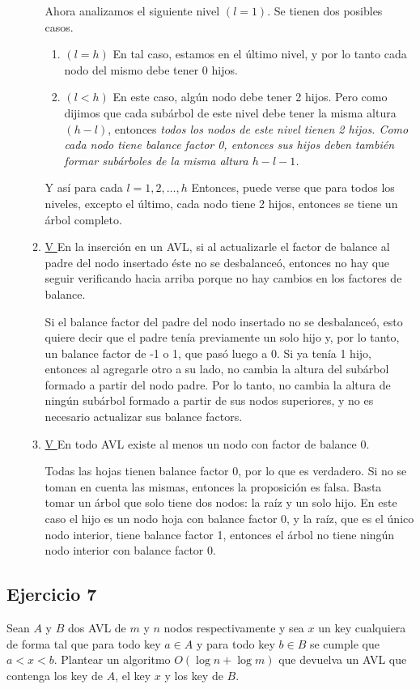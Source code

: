 \documentclass{article}
\begin{document}
\begin{enumerate}
\begin{enumerate}
Ahora analizamos el siguiente nivel $(l=1)$. Se tienen dos posibles casos.
\begin{enumerate}
    \item $(l=h)$ En tal caso, estamos en el último nivel, y por lo tanto cada nodo del mismo debe tener 0 hijos.
    \item $(l<h)$ En este caso, algún nodo debe tener 2 hijos. Pero como dijimos que cada subárbol de este nivel debe tener la misma altura $(h-l)$, entonces \em{todos} los nodos de este nivel tienen 2 hijos. Como cada nodo tiene balance factor 0, entonces sus hijos deben también formar subárboles de la misma altura $h-l-1$.
\end{enumerate}

Y así para cada $l = 1, 2, \dots, h$ Entonces, puede verse que para todos los niveles, excepto el último, cada nodo tiene 2 hijos, entonces se tiene un árbol completo.

\item \underline{ V } En la inserción en un AVL, si al actualizarle el factor de balance al padre del nodo insertado éste no se desbalanceó, entonces no hay que seguir verificando hacia arriba porque no hay cambios en los factores de balance.

Si el balance factor del padre del nodo insertado no se desbalanceó, esto quiere decir que el padre tenía previamente un solo hijo y, por lo tanto, un balance factor de -1 o 1, que pasó luego a 0. Si ya tenía 1 hijo, entonces al agregarle otro a su lado, no cambia la altura del subárbol formado a partir del nodo padre. Por lo tanto, no cambia la altura de ningún subárbol formado a partir de sus nodos superiores, y no es necesario actualizar sus balance factors.

\item \underline{ V } En todo AVL existe al menos un nodo con factor de balance 0.

Todas las hojas tienen balance factor 0, por lo que es verdadero. Si no se toman en cuenta las mismas, entonces la proposición es falsa. Basta tomar un árbol que solo tiene dos nodos: la raíz y un solo hijo. En este caso el hijo es un nodo hoja con balance factor 0, y la raíz, que es el único nodo interior, tiene balance factor 1, entonces el árbol no tiene ningún nodo interior con balance factor 0.

\end{enumerate}
\end{enumerate}


\subsection*{Ejercicio 7}
Sean $A$ y $B$ dos AVL de $m$ y $n$ nodos respectivamente y sea $x$ un key cualquiera de forma tal que para todo key $a\in A$ y para todo key $b\in B$ se cumple que $a < x < b$. Plantear un algoritmo $O(\log n + \log m)$ que devuelva un AVL que contenga los key de $A$, el key $x$ y los key de $B$.
\end{document}
